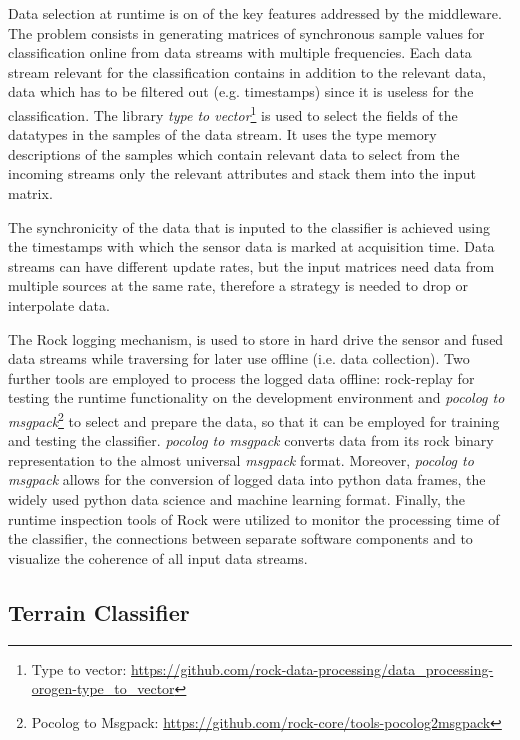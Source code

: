 \documentclass{article}
\begin{document}
Data selection at runtime is on of the key features addressed by the middleware. 
The problem consists in generating matrices of synchronous sample values for classification online from data streams with multiple frequencies.
Each data stream relevant for the classification contains in addition to the relevant data, data which has to be filtered out (e.g. timestamps) since it is useless for the classification.
The library \emph{type to vector}\footnote{Type to vector: \url{https://github.com/rock-data-processing/data_processing-orogen-type_to_vector}} is used to select the fields of the datatypes in the samples of the data stream. 
It uses the type memory descriptions of the samples which contain relevant data to select from the incoming streams only the relevant attributes and stack them into the input matrix. 

The synchronicity of the data that is inputed to the classifier is achieved using the timestamps with which the sensor data is marked at acquisition time.
Data streams can have different update rates, but the input matrices need data from multiple sources at the same rate, therefore a strategy is needed to drop or interpolate data. 

The Rock logging mechanism, is used to store in hard drive the sensor and fused data streams while traversing for later use offline (i.e. data collection). 
Two further tools are employed to process the logged data offline: rock-replay for testing the runtime functionality on the development environment and \emph{pocolog to msgpack}\footnote{Pocolog to Msgpack: \url{https://github.com/rock-core/tools-pocolog2msgpack}} to select and prepare the data, so that it can be employed for training and testing the classifier.
\emph{pocolog to msgpack} converts data from its rock binary representation to the almost universal \emph{msgpack} format.
Moreover, \emph{pocolog to msgpack} allows for the conversion of logged data into python data frames, the widely used python data science and machine learning format. 
Finally, the runtime inspection tools of Rock were utilized to monitor the processing time of the classifier, the connections between separate software components and to visualize the coherence of all input data streams. 


\subsection{Terrain Classifier}
\end{document}
